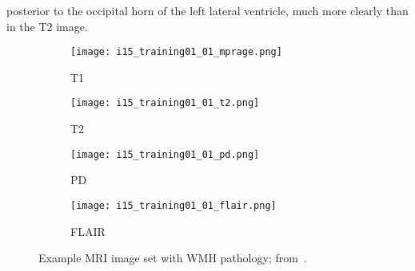 posterior to the occipital horn of the left lateral ventricle,
much more clearly than in the T2 image.
\begin{figure}
  \centering
  \begin{subfigure}{0.24\textwidth}
    \texttt{[image: i15\_training01\_01\_mprage.png]}
    \caption{T1}%
    \label{fig:4mriT1}
  \end{subfigure}
  \begin{subfigure}{0.24\textwidth}
    \texttt{[image: i15\_training01\_01\_t2.png]}
    \caption{T2}%
    \label{fig:4mriT2}
  \end{subfigure}
  \begin{subfigure}{0.24\textwidth}
    \texttt{[image: i15\_training01\_01\_pd.png]}
    \caption{PD}%
    \label{fig:4mriPD}
  \end{subfigure}
  \begin{subfigure}{0.24\textwidth}
    \texttt{[image: i15\_training01\_01\_flair.png]}
    \caption{FLAIR}%
    \label{fig:4mriIR}
  \end{subfigure}
  \caption{Example MRI image set with WMH pathology; from~\cite{WMHSEG2017}.}%
  \label{fig:4mri}
\end{figure}
